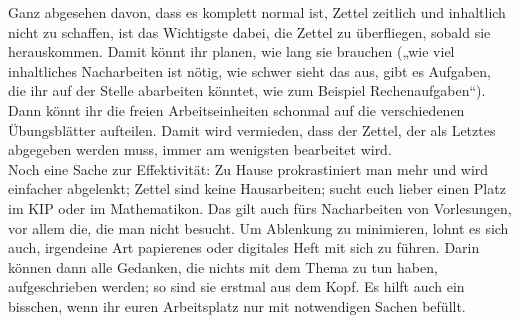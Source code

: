 Ganz abgesehen davon, dass es komplett normal ist, Zettel zeitlich und inhaltlich nicht zu schaffen, ist das Wichtigste dabei, die Zettel zu überfliegen, sobald sie herauskommen. Damit könnt ihr planen, wie lang sie brauchen („wie viel inhaltliches Nacharbeiten ist nötig, wie schwer sieht das aus, gibt es Aufgaben, die ihr auf der Stelle abarbeiten könntet, wie zum Beispiel Rechenaufgaben“). Dann könnt ihr die freien Arbeitseinheiten schonmal auf die verschiedenen Übungsblätter aufteilen. Damit wird vermieden, dass der Zettel, der als Letztes abgegeben werden muss, immer am wenigsten bearbeitet wird. \\
Noch eine Sache zur Effektivität: Zu Hause prokrastiniert man mehr und wird einfacher abgelenkt; Zettel sind keine Hausarbeiten; sucht euch lieber einen Platz im \gls{KIP} oder im \gls{Mathematikon}. Das gilt auch fürs Nacharbeiten von Vorlesungen, vor allem die, die man nicht besucht. Um Ablenkung zu minimieren, lohnt es sich auch, irgendeine Art papierenes oder digitales Heft mit sich zu führen. Darin können dann alle Gedanken, die nichts mit dem Thema zu tun haben, aufgeschrieben werden; so sind sie erstmal aus dem Kopf. Es hilft auch ein bisschen, wenn ihr euren Arbeitsplatz nur mit notwendigen Sachen befüllt.
